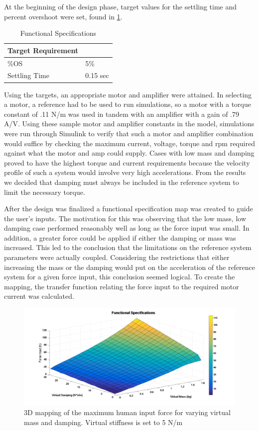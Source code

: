 At the beginning of the design phase, target values for the settling time and percent overshoot were set, found in \ref{specs}.
\begin{table}[H]
	\centering
	\caption{Functional Specifications}
	\label{specs}
	\begin{tabular}{|l|l|}
		\hline
		Target Requirement &          \\ \hline
		\%OS               & 5\%      \\ \hline
		Settling Time      & 0.15 sec \\ \hline
	\end{tabular}
\end{table}
Using the targets, an appropriate motor and amplifier were attained. In selecting a motor, a reference had to be used to run simulations, so a motor with a torque constant of .11 N/m was used in tandem with an amplifier with a gain of .79 A/V. Using these sample motor and amplifier constants in the model, simulations were run through Simulink to verify that such a motor and amplifier combination would suffice by checking the maximum current, voltage, torque and rpm required against what the motor and amp could supply. Cases with low mass and damping proved to have the highest torque and current requirements because the velocity profile of such a system would involve very high accelerations. From the results we decided that damping must always be included in the reference system to limit the necessary torque. \par
After the design was finalized a functional specification map was created to guide the user's inputs. The motivation for this was observing that the low mass, low damping case performed reasonably well as long as the force input was small. In addition, a greater force could be applied if either the damping or mass was increased. This led to the conclusion that the limitations on the reference system parameters were actually coupled. Considering the restrictions that either increasing the mass or the damping would put on the acceleration of the reference system for a given force input, this conclusion seemed logical. To create the mapping, the transfer function relating the force input to the required motor current was calculated.
\begin{figure}
	\includegraphics[width=1\linewidth]{Images/Functional_Specifications_Mapping}
	\caption{3D mapping of the maximum human input force for varying virtual mass and damping. Virtual stiffness is set to 5 N/m}
	\label{fig:Functional_Specifications_Mapping}
\end{figure}
